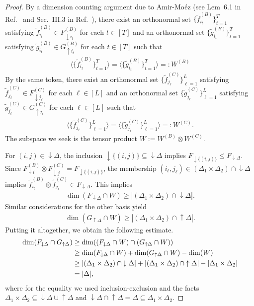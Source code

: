 \documentclass[12pt]{article}
\theoremstyle{definition}
\numberwithin{equation}{section}
\numberwithin{equation}{section}
\newcommand{\da}{\downarrow}
\newcommand{\ua}{\uparrow}
\begin{document}
\begin{proof}
By a dimension counting argument due to Amir-Moéz (see Lem~6.1 in Ref.~\cite{Ando_1989} and Sec.~III.3 in Ref.~\cite{Bhatia1997}), there exist an orthonormal set \(\{\tilde{f}^{(B)}_{i_t}\}_{t=1}^T\)  satisfying 
\(\tilde{f}^{(B)}_{i_t} \in F^{(B)}_{\da i_t}\) for each \(t \in [T]\) and an orthonormal set \(\{ \tilde{g}^{(B)}_{i_t} \}_{t=1}^T\) satisfying 
\(\tilde{g}^{(B)}_{i_t} \in G^{(B)}_{\ua i_t}\) for each \(t \in [T]\) such that 
\begin{align}
\label{eq: W_1 }
\langle \{\tilde{f}^{(B)}_{i_t}\}_{t=1}^T \rangle = \langle \{ \tilde{g}^{(B)}_{i_t}\}_{t=1}^T \rangle=: W^{(B)}  
\end{align}
By the same token, there exist an orthonormal set \(\{\tilde{f}^{(C)}_{j_\ell}\}_{\ell=1}^L\)  satisfying \(\tilde{f}^{(C)}_{j_\ell} \in F^{(C)}_{\da j_\ell}\) for each \(\ell \in [L]\) and an orthonormal set \(\{ \tilde{g}^{(C)}_{j_\ell} \}_{\ell=1}^L\) satisfying \(\tilde{g}^{(C)}_{j_\ell} \in G^{(C)}_{\ua j_\ell}\) for each \(\ell \in [L]\) such that 
\begin{align}
\label{eq: W_2}
\langle \{\tilde{f}^{(C)}_{j_\ell}\}_{\ell=1}^L \rangle = \langle \{ \tilde{g}^{(C)}_{j_\ell}\}_{\ell=1}^L \rangle=: W^{(C)}.
\end{align}
The subspace we seek is the tensor product \(W := W^{(B)} \otimes W^{(C)}\).

For \((i, j) \in {\da \Delta}\), the inclusion \(\da\{ (i, j)\} \subseteq {\da \Delta}\) implies \(F_{\da \{(i,j)\}} \leq F_{\da \Delta}\). Since \(F_{\da i}^{(B)} \otimes F_{\da j}^{(C)} = F_{\da \{(i,j)\}}\), the membership \((i_t, j_\ell) \in (\Delta_1 \times \Delta_2) \cap {\da \Delta} \) implies \(\tilde{f}^{(B)}_{i_t} \otimes \tilde{f}^{(C)}_{j_\ell} \in F_{\da \Delta}\). This implies 
\begin{gather}
 \dim(F_{\da \Delta} \cap W) \geq |(\Delta_1 \times \Delta_2) \cap {\da \Delta}|.   
\end{gather}
Similar considerations for the other basis yield  
\begin{gather}
\dim( G_{\ua \Delta} \cap W) \geq | (\Delta_1 \times \Delta_2) \cap {\ua \Delta}|.     
\end{gather}
Putting it altogether, we obtain the following estimate.
\begin{align}
   \dim (F_{\da \Delta} \cap G_{\ua \Delta}) &\geq \dim ((F_{\da \Delta} \cap W) \cap (G_{\ua \Delta} \cap W)) \notag\\
   &\geq \dim(F_{\da \Delta} \cap W) + \dim(G_{\ua \Delta} \cap W) - \dim(W) \notag \\
   &\geq |(\Delta_1 \times \Delta_2) \cap {\da \Delta}| + | (\Delta_1 \times \Delta_2) \cap {\ua \Delta}| - |\Delta_1 \times \Delta_2| \notag \\
   &= |\Delta|, 
\end{align} 
where for the equality we used inclusion-exclusion and the facts \(\Delta_1 \times \Delta_2 \subseteq  {\da \Delta} \cup {\ua \Delta}\) and \({\da \Delta} \cap {\ua \Delta} = \Delta \subseteq \Delta_1 \times \Delta_2\). \end{proof}
\end{document}
